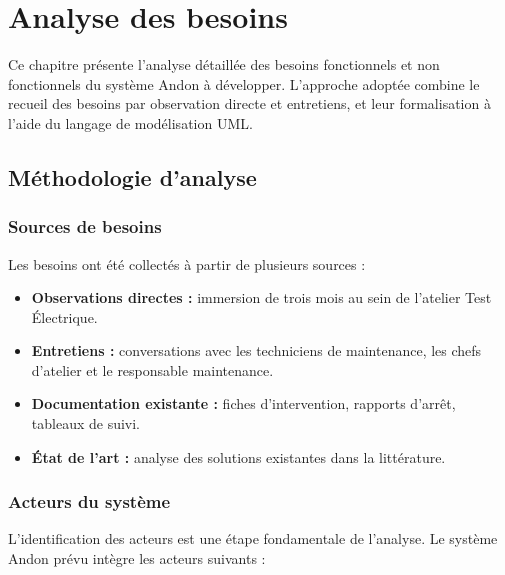 \chapter{Analyse des besoins}

Ce chapitre pr\'esente l'analyse d\'etaill\'ee des besoins fonctionnels et non fonctionnels du syst\`eme Andon \`a d\'evelopper. L'approche adopt\'ee combine le recueil des besoins par observation directe et entretiens, et leur formalisation \`a l'aide du langage de mod\'elisation UML.

\section{M\'ethodologie d'analyse}

\subsection{Sources de besoins}

Les besoins ont \'et\'e collect\'es \`a partir de plusieurs sources :

\begin{itemize}
    \item \textbf{Observations directes :} immersion de trois mois au sein de l'atelier Test \'Electrique.
    \item \textbf{Entretiens :} conversations avec les techniciens de maintenance, les chefs d'atelier et le responsable maintenance.
    \item \textbf{Documentation existante :} fiches d'intervention, rapports d'arr\^et, tableaux de suivi.
    \item \textbf{\'Etat de l'art :} analyse des solutions existantes dans la litt\'erature.
\end{itemize}

\subsection{Acteurs du syst\`eme}

L'identification des acteurs est une \'etape fondamentale de l'analyse. Le syst\`eme Andon pr\'evu int\`egre les acteurs suivants :

